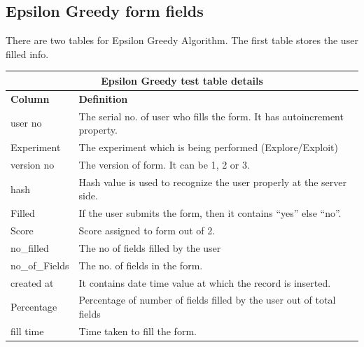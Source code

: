 \documentclass[12pt]{report}
\begin{document}
\subsection{ Epsilon Greedy form fields}
There are two tables for Epsilon Greedy Algorithm.
\newline
The first table stores the user filled info.
\newline
\newline
\newline
\begin{tabular}{ |p{3cm}|p{12cm}|  }
\hline
\multicolumn{2}{|c|}{ \textbf {Epsilon Greedy test table details}} \\
\hline
 \textbf {Column} & \textbf { Definition}  \\
\hline
user no & The serial no. of user who fills the form. It has autoincrement property.  \\
\hline
Experiment & The experiment which is being performed (Explore/Exploit)  \\
\hline
version no & The version of form. It can be 1, 2 or 3.   \\
\hline
hash & Hash value is used to recognize the user properly at the server side.  \\
\hline
Filled  &  If the user submits the form, then it contains “yes” else “no”. \\
\hline
Score & Score assigned to form out of 2.  \\
\hline
no\_filled & The no of fields filled by the user \\
\hline
no\_of\_Fields & The no. of fields in the form.  \\
\hline
created at & It contains date time value at which the record is inserted.  \\
\hline
Percentage & Percentage of number of fields filled by the user out of total fields   \\
\hline
fill time & Time taken to fill the form.  \\
\hline
\end{tabular}
\newpage
\end{document}
